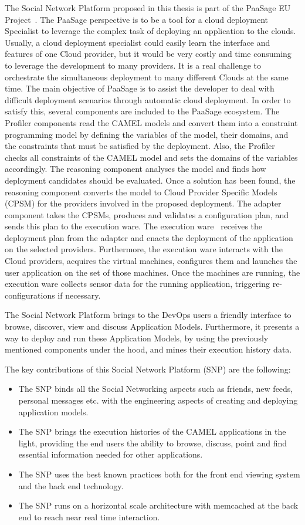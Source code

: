 The Social Network Platform proposed in this thesis is part of the PaaSage EU Project~\cite{paasage}.
The PaaSage perspective is to be a tool for a cloud deployment Specialist to leverage the complex task of deploying an application to the clouds. Usually, a cloud deployment specialist could easily learn the interface and features of one Cloud provider, but it would be very costly and time consuming to leverage the development to many providers. It is a real challenge to orchestrate the simultaneous deployment to many different Clouds at the same time. The main objective of PaaSage is to assist the developer to deal with difficult deployment scenarios through automatic cloud deployment. In order to satisfy this, several components are included to the PaaSage ecosystem. The Profiler components read the CAMEL models and convert them into a constraint programming model by defining the variables of the model, their domains, and the constraints that must be satisfied by the deployment. Also, the Profiler checks all constraints of the CAMEL model and sets the domains of the variables accordingly. The reasoning component analyses the model and finds how deployment candidates should be evaluated. Once a solution has been found, the reasoning component converts the model to Cloud Provider Specific Models (CPSM) for the providers involved in the proposed deployment. The adapter component takes the CPSMs, produces and validates a configuration plan, and sends this plan to the execution ware. The execution ware~\cite{baur2014towards} receives the deployment plan from the adapter and enacts the deployment of the application on the selected providers. Furthermore, the execution ware interacts with the Cloud providers, acquires the virtual machines, configures them and launches the user application on the set of those machines. Once the machines are running, the execution ware collects sensor data for the running application, triggering re-configurations if necessary.

The Social Network Platform brings to the DevOps users a friendly interface to browse, discover, view and discuss Application Models. Furthermore, it presents a way to deploy and run these Application Models, by using the previously mentioned components under the hood, and mines their execution history data.

The key contributions of this Social Network Platform (SNP) are the following:
\begin{itemize}
\item The SNP binds all the Social Networking aspects such as friends, new feeds, personal messages etc. with the engineering aspects of creating and deploying application models.
\item The SNP brings the execution histories of the CAMEL applications in the light, providing the end users the ability to browse, discuss, point and find essential information needed for other applications.
\item The SNP uses the best known practices both for the front end viewing system and the back end technology.
\item The SNP runs on a horizontal scale architecture with memcached at the back end to reach near real time interaction. 
\end{itemize}


